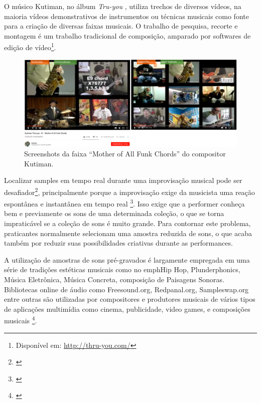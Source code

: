O músico Kutiman, no álbum \emph{Tru-you} \citeyear{Kutiman2010}, utiliza trechos de diversos vídeos, na maioria vídeos demonstrativos de instrumentos ou técnicas musicais como fonte para a criação de diversas faixas musicais. O trabalho de pesquisa, recorte e montagem é um trabalho tradicional de composição, amparado por softwares de edição de vídeo\footnote{Disponível em: \url{http://thru-you.com/}}. 


\begin{figure}
\includegraphics[width=1\textwidth]{pictures/cap4/kutiman}
\caption{Screenshots da faixa ``Mother of All Funk Chords'' do compositor Kutiman. }
\label{Kutiman}
\end{figure}


Localizar samples em tempo real durante uma improvisação musical pode ser desafiador\footnote{\cite{Xambo2018}}, principalmente porque a improvisação exige da musicista uma reação espontânea e instantânea em tempo real \footnote{\cite{canonne2011model}}. Isso exige que a performer conheça bem e previamente os sons de uma determinada coleção, o que se torna impraticável se a coleção de sons é muito grande. Para contornar este problema, praticantes normalmente selecionam uma amostra reduzida de sons, o que acaba também por reduzir suas possibilidades criativas durante as performances.


A utilização de amostras de sons pré-gravados é largamente empregada em uma série de tradições estéticas musicais como no emph{Hip Hop, Plunderphonics, Música Eletrônica, Música Concreta, composição de Paisagens Sonoras}. Bibliotecas online de áudio como Freesound.org, Redpanal.org, Sampleswap.org entre outras são utilizadas por compositores e produtores musicais de vários tipos de aplicações multimídia como cinema, publicidade, video games, e composições musicais \footnote{\cite{Roma2013}}. 

